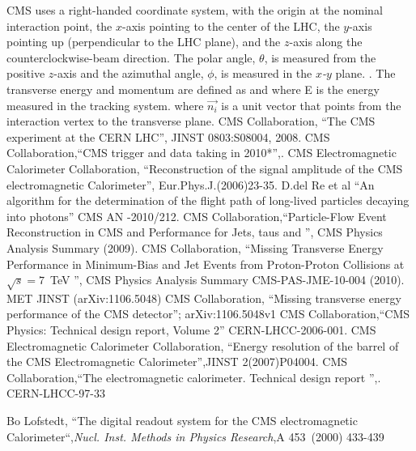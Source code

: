 \begin{thebibliography}{9}
CMS uses a right-handed coordinate system, with the origin at the nominal interaction point, the \emph{$x$}-axis pointing to the center of the LHC, 
the \emph{$y$}-axis pointing up (perpendicular to the LHC plane), and the \emph{$z$}-axis along the counterclockwise-beam direction. The polar angle, $\theta$, 
is measured from the positive \emph{$z$}-axis and the azimuthal angle, $\phi$, is measured in the \emph{$x$-$y$} plane. . 
The transverse energy and momentum are defined as  and  where \textsc{E} is the energy measured in the 
tracking system. where $\vec{n_{i}}$ is a unit vector that points from the interaction vertex to the transverse plane.
CMS Collaboration, ``The CMS experiment at the CERN LHC'', JINST 0803:S08004, 2008.
CMS Collaboration,``CMS trigger and data taking in 2010*'',.
CMS Electromagnetic Calorimeter Collaboration, ``Reconstruction of the signal amplitude of the CMS electromagnetic Calorimeter'', Eur.Phys.J.(2006)23-35.
 D.del Re et al ``An algorithm for the determination of the flight path of long-lived particles decaying into photons'' CMS AN -2010/212.
CMS Collaboration,``Particle-Flow Event Reconstruction in CMS and Performance for Jets, taus and \ETslash'', CMS Physics Analysis Summary (2009).
CMS Collaboration, “Missing Transverse Energy Performance in Minimum-Bias and Jet Events from Proton-Proton Collisions at $\sqrt{s} =7$~TeV ”, CMS Physics Analysis Summary
CMS-PAS-JME-10-004 (2010).
MET JINST (arXiv:1106.5048)
CMS Collaboration, ``Missing transverse energy performance of the CMS detector''; arXiv:1106.5048v1
CMS Collaboration,``CMS Physics: Technical design report, Volume 2'' CERN-LHCC-2006-001.
CMS Electromagnetic Calorimeter Collaboration, ``Energy resolution of the barrel of the CMS Electromagnetic Calorimeter'',JINST 2(2007)P04004.
CMS Collaboration,``The electromagnetic calorimeter. Technical design report '',. CERN-LHCC-97-33

 Bo Lofstedt, ``The digital readout system for the CMS electromagnetic Calorimeter``,\textit{Nucl. Inst.  Methods in Physics Research},A 453~(2000) 433-439


\end{thebibliography}
